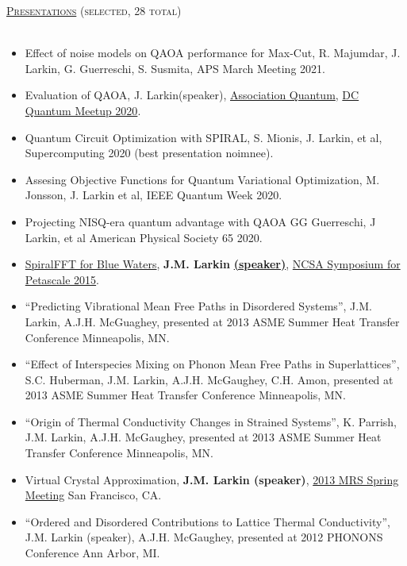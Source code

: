 \documentclass{article}
\newcommand{\lineunder}{\vspace*{-8pt} \\ \hspace*{-18pt} \hrulefill \\}
\newcommand{\header}[1]{{\hspace*{-15pt}\vspace*{6pt} \textsc{#1}} \vspace*{-6pt} \lineunder}
\newenvironment{achievements}{\begin{list}{$\bullet$}{\topsep 0pt \itemsep -2pt}}{\vspace*{4pt}\end{list}}
\begin{document}

\header{\Large{\href{http://jasonlarkin.org/pres.html}{Presentations} (selected, 28 total)}}
\begin{itemize}[leftmargin=*]
\item Effect of noise models on QAOA performance for Max-Cut, R. Majumdar, J. Larkin, G. Guerreschi, S. Susmita, APS March Meeting 2021.
\item Evaluation of QAOA, J. Larkin(speaker), \href{https://www.youtube.com/watch?v=I7yp-qXk0Zo}{Association Quantum}, \href{https://www.meetup.com/Washington-Quantum-Computing-Meetup/events/272829277/}{DC Quantum Meetup 2020}.
\item Quantum Circuit Optimization with SPIRAL, S. Mionis, J. Larkin, et al, Supercomputing 2020 (best presentation noimnee).
\item Assesing Objective Functions for Quantum Variational Optimization, M. Jonsson, J. Larkin et al, IEEE Quantum Week 2020.
\item Projecting NISQ-era quantum advantage with QAOA
GG Guerreschi, J Larkin, et al American Physical Society 65 2020.
\item \href{https://bluewaters.ncsa.illinois.edu/documents/10157/5a0a0d37-95bf-460b-a7f0-cfadd15abec8}{SpiralFFT for Blue Waters}, \textbf{J.M. Larkin} \href{https://www.youtube.com/watch?v=rjbEWeu2Nwc&feature=youtu.be#t=51m53s}{\textbf{(speaker)}}, \href{https://bluewaters.ncsa.illinois.edu/paid-ime#SPIRAL FFT}{NCSA Symposium for Petascale 2015}.
\item “Predicting Vibrational Mean Free Paths in Disordered Systems”, J.M. Larkin, A.J.H. McGuaghey,  presented at 2013 ASME Summer Heat Transfer Conference Minneapolis, MN.
\item “Effect of Interspecies Mixing on Phonon Mean Free Paths in Superlattices”, S.C. Huberman, J.M. Larkin, A.J.H. McGaughey, C.H. Amon, presented at 2013 ASME Summer Heat Transfer Conference Minneapolis, MN.
\item “Origin of Thermal Conductivity Changes in Strained Systems”, K. Parrish, J.M. Larkin, A.J.H. McGaughey, presented at 2013 ASME Summer Heat Transfer Conference Minneapolis, MN.
\item Virtual Crystal Approximation, \textbf{J.M. Larkin (speaker)}, \href{http://www.mrs.org/spring2013/}{2013 MRS Spring Meeting} San Francisco, CA.
\item “Ordered and Disordered Contributions to Lattice Thermal Conductivity”, J.M. Larkin (speaker), A.J.H. McGaughey, presented at 2012 PHONONS Conference Ann Arbor, MI.

\end{itemize}
\end{document}
